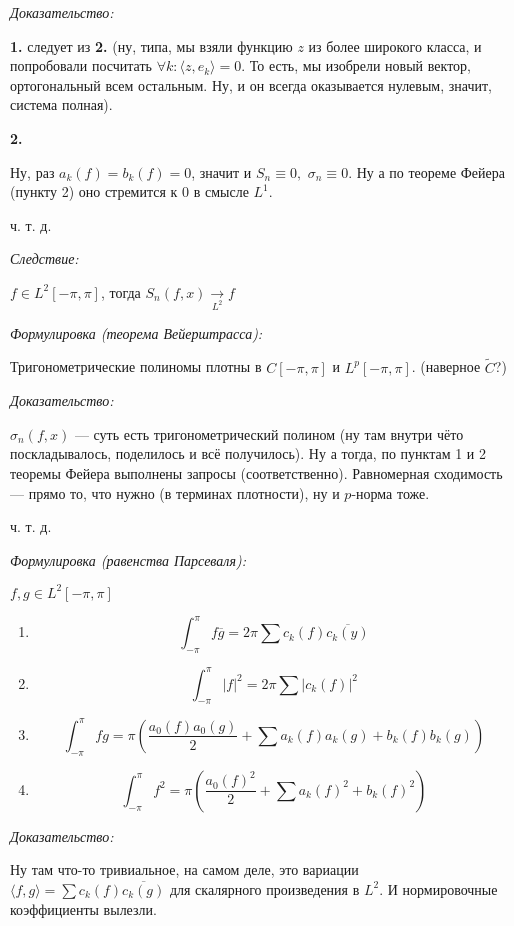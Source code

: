 \documentclass{article}
\def\dbl{\,\,}
\def\goesto#1{\underset{#1}{\longrightarrow}}
\def\sk#1#2{\langle #1, #2 \rangle}
\begin{document}
\textit{Доказательство:}

\textbf{1.} следует из \textbf{2.} (ну, типа, мы взяли функцию $z$ из более широкого класса, и попробовали посчитать $\forall k: \sk{z}{e_k} = 0$. То есть, мы изобрели новый вектор, ортогональный всем остальным. Ну, и он всегда оказывается нулевым, значит, система полная).

\textbf{2.}

Ну, раз $a_k(f) = b_k(f) = 0$, значит и $S_n \equiv 0, \dbl \sigma_n \equiv 0$. Ну а по теореме Фейера (пункту 2) оно стремится к $0$ в смысле $L^1$. 

ч. т. д. 

\textit{Следствие: }

$f \in L^2[-\pi, \pi]$, тогда $S_n(f, x) \goesto{L^2} f$

\textit{Формулировка (теорема Вейерштрасса):}

Тригонометрические полиномы плотны в $C[-\pi, \pi]$ и $L^p[-\pi, \pi]$. (наверное $\tilde{C}$?)

\textit{Доказательство:}

$\sigma_n(f, x)$ --- суть есть тригонометрический полином (ну там внутри чёто поскладывалось, поделилось и всё получилось). Ну а тогда, по пунктам 1 и 2 теоремы Фейера выполнены запросы (соответственно). Равномерная сходимость --- прямо то, что нужно (в терминах плотности), ну и $p$-норма тоже.

ч. т. д. 

\textit{Формулировка (равенства Парсеваля):}

$f, g \in L^2[-\pi, \pi]$

\begin{enumerate}
    \item \[\int_{-\pi}^{\pi} f \overline{g} = 2\pi \sum c_k(f) \overline{c_k(y)}\]
    \item \[\int_{-\pi}^{\pi} |f|^2 = 2\pi \sum |c_k(f)|^2\]
    \item \[\int_{-\pi}^{\pi} fg = \pi \left(\frac{a_0(f)a_0(g)}{2} + \sum a_k(f)a_k(g) + b_k(f)b_k(g)\right)\]
    \item \[\int_{-\pi}^{\pi} f^2 = \pi \left( \frac{a_0(f)^2}{2} + \sum a_k(f)^2 + b_k(f)^2 \right)\]
\end{enumerate}

\textit{Доказательство:}

Ну там что-то тривиальное, на самом деле, это вариации $\sk{f}{g} = \sum c_k(f) \overline{c_k(g)}$ для скалярного произведения в $L^2$. И нормировочные коэффициенты вылезли.
\end{document}
